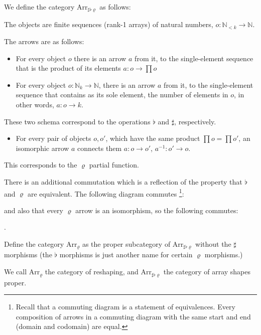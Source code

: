 \documentclass{DIKU-report-variant}
\newcommand\mrm[1]{\mathrm{#1}}
\newcommand\brm[1]{\bm{\mrm{#1}}}
\newcommand\Nat{\mathbb{N}}
\newcommand\Arr[1]{{\brm{Arr}_{\brm{#1}}}}
\newcommand\SFR{\sharp\flat\varrho}
\begin{document}
\begin{definition}
  \label{def:category-of-shapes}
  We define the category \(\Arr\SFR\) as follows:

  The objects are finite sequences (rank-1 arrays)
  of natural numbers, \(o : \Nat_{<k} \to \Nat\).

  The arrows are as follows:
  \begin{itemize}
    \item For every object \(o\)
      there is an arrow \(a\) from it, to the single-element sequence
      that is the product of its elements \(a : o \to \prod o\)
    \item For every object \(o : \Nat_k \to \Nat\),
      there is an arrow \(a\) from it, to the single-element sequence
      that contains as its sole element, the number of elements in \(o\), in
      other words, \(a : o \to k\).
  \end{itemize}
  These two schema correspond to the operations \(\flat\) and \(\sharp\), respectively.

  \begin{itemize}
    \item For every pair of objects \(o, o'\), which have the same product
      \(\prod o = \prod o'\), an isomorphic arrow \(a\) connects them
      \( a : o \to o'\), \(a^{-1} : o' \to o\).
  \end{itemize}
  This corresponds to the \(\varrho\) partial function. 

  There is an additional commutation which is a reflection of the
  property that \(\flat\) and \(\varrho\) are equivalent.
  The following diagram commutes
    \footnote{Recall that a commuting diagram is a statement of equivalences. Every composition
    of arrows in a commuting diagram with the same start and end (domain and codomain) are equal.}:
  \begin{center}
  \end{center}
  and also that every \(\varrho\) arrow is an isomorphism, so the following commutes:
  \begin{center}
  .
  \end{center}

  Define the category \(\Arr\varrho\) as the proper subcategory of \(\Arr\SFR\) without the
  \(\sharp\) morphisms (the \(\flat\) morphisms is just another name for certain \(\varrho\) morphisms.)

  We call \(\Arr\varrho\) the category of reshaping, and \(\Arr\SFR\) the category of array
  shapes proper.
\end{definition}
\end{document}
